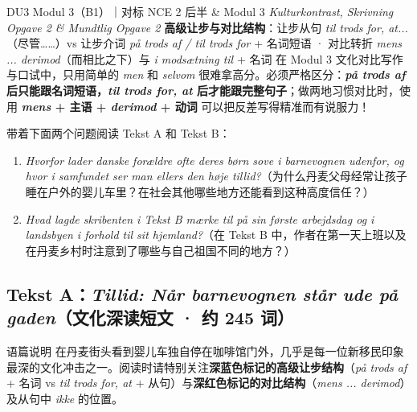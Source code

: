 {DU3 Modul 3（B1）｜对标 NCE 2 后半 \& Modul 3 \textit{Kulturkontrast, Skrivning Opgave 2 \& Mundtlig Opgave 2}}
{\textbf{高级让步与对比结构}：让步从句 \textit{til trods for, at...}（尽管……）vs 让步介词 \textit{på trods af / til trods for} + 名词短语 · 对比转折 \textit{mens ... derimod}（而相比之下）与 \textit{i modsætning til} + 名词}
{在 Modul 3 文化对比写作与口试中，只用简单的 \textit{men} 和 \textit{selvom} 很难拿高分。必须严格区分：\textbf{\textit{på trods af} 后只能跟名词短语，\textit{til trods for, at} 后才能跟完整句子}；做两地习惯对比时，使用 \textbf{\textit{mens} + 主语 + \textit{derimod} + 动词} 可以把反差写得精准而有说服力！}

\begin{foerduleaeser}
带着下面两个问题阅读 Tekst A 和 Tekst B：
\begin{enumerate}
  \item \textit{Hvorfor lader danske forældre ofte deres børn sove i barnevognen udenfor, og hvor i samfundet ser man ellers den høje tillid?}（为什么丹麦父母经常让孩子睡在户外的婴儿车里？在社会其他哪些地方还能看到这种高度信任？）
  \item \textit{Hvad lagde skribenten i Tekst B mærke til på sin første arbejdsdag og i landsbyen i forhold til sit hjemland?}（在 Tekst B 中，作者在第一天上班以及在丹麦乡村时注意到了哪些与自己祖国不同的地方？）
\end{enumerate}
\end{foerduleaeser}


\subsection*{Tekst A：\textit{Tillid: Når barnevognen står ude på gaden}（文化深读短文 · 约 245 词）}

\begin{tipbox}{语篇说明}
在丹麦街头看到婴儿车独自停在咖啡馆门外，几乎是每一位新移民印象最深的文化冲击之一。阅读时请特别关注\textbf{\color{NCDNavy}深蓝色标记的高级让步结构}（\textit{på trods af} + 名词 vs \textit{til trods for, at} + 从句）与\textbf{\color{NCDRed}深红色标记的对比结构}（\textit{mens ... derimod}）及从句中 \textit{ikke} 的位置。
\end{tipbox}

